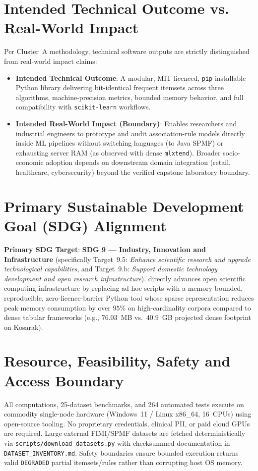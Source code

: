 \section{Intended Technical Outcome vs. Real-World Impact}
Per Cluster~A methodology, technical software outputs are strictly distinguished from real-world impact claims:
\begin{itemize}
  \item \textbf{Intended Technical Outcome}: A modular, MIT-licenced, \texttt{pip}-installable Python library delivering bit-identical frequent itemsets across three algorithms, machine-precision metrics, bounded memory behavior, and full compatibility with \texttt{scikit-learn} workflows.
  \item \textbf{Intended Real-World Impact (Boundary)}: Enables researchers and industrial engineers to prototype and audit association-rule models directly inside ML pipelines without switching languages (to Java SPMF) or exhausting server RAM (as observed with dense \texttt{mlxtend}). Broader socio-economic adoption depends on downstream domain integration (retail, healthcare, cybersecurity) beyond the verified capstone laboratory boundary.
\end{itemize}

\section{Primary Sustainable Development Goal (SDG) Alignment}
\textbf{Primary SDG Target}: \textbf{SDG 9 --- Industry, Innovation and Infrastructure} (specifically Target~9.5: \emph{Enhance scientific research and upgrade technological capabilities}, and Target~9.b: \emph{Support domestic technology development and open research infrastructure}). \skarm directly advances open scientific computing infrastructure by replacing ad-hoc scripts with a memory-bounded, reproducible, zero-licence-barrier Python tool whose sparse representation reduces peak memory consumption by over $95\%$ on high-cardinality corpora compared to dense tabular frameworks (e.g., $76.03$~MB vs.\ $40.9$~GB projected dense footprint on Kosarak).

\section{Resource, Feasibility, Safety and Access Boundary}
All computations, 25-dataset benchmarks, and 264 automated tests execute on commodity single-node hardware (Windows~11 / Linux x86\_64, 16~CPUs) using open-source tooling. No proprietary credentials, clinical PII, or paid cloud GPUs are required. Large external FIMI/SPMF datasets are fetched deterministically via \texttt{scripts/download\_\protect\allowbreak{}datasets.py} with checksummed documentation in \texttt{DATASET\_\protect\allowbreak{}INVENTORY.md}. Safety boundaries ensure bounded execution returns valid \texttt{DEGRADED} partial itemsets/rules rather than corrupting host OS memory.

